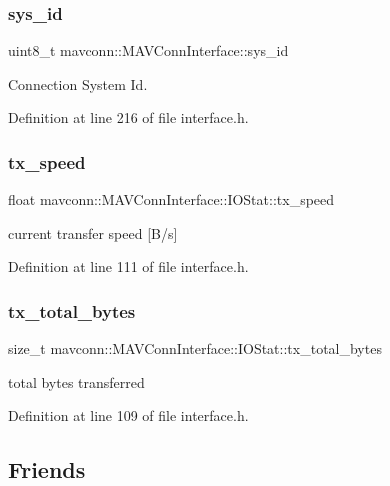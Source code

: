 \subsubsection{\texorpdfstring{sys\_id}{sys\_id}}
{\footnotesize\ttfamily uint8\+\_\+t mavconn\+::\+M\+A\+V\+Conn\+Interface\+::sys\+\_\+id\hspace{0.3cm}{\ttfamily [protected]}}



Connection System Id. 



Definition at line 216 of file interface.\+h.

\mbox{\label{group__mavconn_gadbe490b44c012f629ee0dc0302c17a8b}} 
\subsubsection{\texorpdfstring{tx\_speed}{tx\_speed}}
{\footnotesize\ttfamily float mavconn\+::\+M\+A\+V\+Conn\+Interface\+::\+I\+O\+Stat\+::tx\+\_\+speed}



current transfer speed \mbox{[}B/s\mbox{]} 



Definition at line 111 of file interface.\+h.

\mbox{\label{group__mavconn_ga941de0f0d1968c6b2d272d5834d8f526}} 
\subsubsection{\texorpdfstring{tx\_total\_bytes}{tx\_total\_bytes}}
{\footnotesize\ttfamily size\+\_\+t mavconn\+::\+M\+A\+V\+Conn\+Interface\+::\+I\+O\+Stat\+::tx\+\_\+total\+\_\+bytes}



total bytes transferred 



Definition at line 109 of file interface.\+h.



\subsection{Friends}
\mbox{\label{group__mavconn_gaa93ce54993292c6350cf74aa47fde6cd}} 
